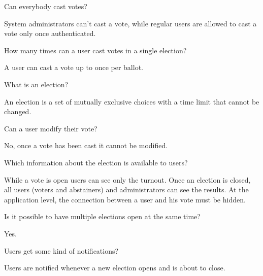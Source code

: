 \documentclass{scrartcl}
\begin{document}
\begin{Question}
    Can everybody cast votes?
\end{Question}
\begin{Answer}
    System administrators can't cast a vote, while regular users are allowed to cast a vote only once authenticated.
\end{Answer}

\begin{Question}
    How many times can a user cast votes in a single election?
\end{Question}
\begin{Answer}
    A user can cast a vote up to once per ballot.
\end{Answer}

\begin{Question}
    What is an election?
\end{Question}
\begin{Answer}
    An election is a set of mutually exclusive choices with a time limit that cannot be changed.
\end{Answer}

\begin{Question}
    Can a user modify their vote?
\end{Question}
\begin{Answer}
    No, once a vote has been cast it cannot be modified.
\end{Answer}

\begin{Question}
    Which information about the election is available to users?
\end{Question}
\begin{Answer}
    While a vote is open users can see only the turnout. Once an election is closed, all users (voters and abstainers) and administrators can see the results. At the application level, the connection between a user and his vote must be hidden.
\end{Answer}

\begin{Question}
    Is it possible to have multiple elections open at the same time?
\end{Question}
\begin{Answer}
    Yes.
\end{Answer}

\begin{Question}
    Users get some kind of notifications?
\end{Question}
\begin{Answer}
    Users are notified whenever a new election opens and is about to close.
\end{Answer}
\end{document}
